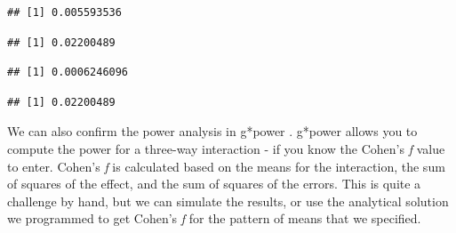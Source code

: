 \documentclass[
]{book}
\newenvironment{Shaded}{\begin{snugshade}}{\end{snugshade}}
\newcommand{\CommentTok}[1]{\textcolor[rgb]{0.56,0.35,0.01}{\textit{#1}}}
\newcommand{\NormalTok}[1]{#1}
\newcommand{\SpecialCharTok}[1]{\textcolor[rgb]{0.00,0.00,0.00}{#1}}
\begin{document}
\begin{verbatim}
## [1] 0.005593536
\end{verbatim}

\begin{Shaded}
\end{Shaded}

\begin{verbatim}
## [1] 0.02200489
\end{verbatim}

\begin{Shaded}
\end{Shaded}

\begin{verbatim}
## [1] 0.0006246096
\end{verbatim}

\begin{Shaded}
\end{Shaded}

\begin{verbatim}
## [1] 0.02200489
\end{verbatim}

We can also confirm the power analysis in g*power \citep{faul2007g}. g*power allows you to compute the power for a three-way interaction - if you know the Cohen's \emph{f} value to enter. Cohen's \emph{f} is calculated based on the means for the interaction, the sum of squares of the effect, and the sum of squares of the errors. This is quite a challenge by hand, but we can simulate the results, or use the analytical solution we programmed to get Cohen's \emph{f} for the pattern of means that we specified.

\begin{Shaded}
\end{Shaded}
\end{document}
